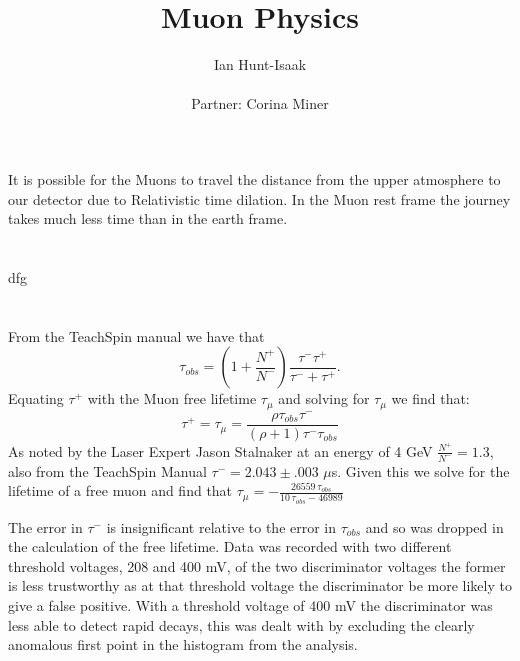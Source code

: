 \documentclass[11pt,letterpaper]{article}
\title{Muon Physics}
\author{Ian Hunt-Isaak\\ \begin{small}
Partner: Corina Miner
\end{small}}
\begin{document}
\date{}
\maketitle
\section{} %
It is possible for the Muons to travel the distance from the upper atmosphere to our detector due to Relativistic time dilation. In the Muon rest frame the journey takes much less time than in the earth frame. 


\section{} %
dfg
\section{} %
From the TeachSpin manual we have that 
\begin{equation}
\label{eq:t_obs}
    \tau_{obs} = \left(1+\frac{N^+}{N^-}\right)\frac{\tau^-\tau^+}{\tau^-+\tau^+}.
\end{equation}
Equating $\tau^+$ with the Muon free lifetime $\tau_{\mu}$ and solving for $\tau_{\mu}$ we find that:
\begin{equation}
 \tau^+=\tau_{\mu} = \frac{\rho\tau_{\mathit{obs}} \tau^-}{{\left(\rho + 1\right)} \tau^ - \tau_{\mathit{obs}}}
\end{equation}
As noted by the Laser Expert Jason Stalnaker at an energy of 4 GeV $\frac{N^+}{N^-}=1.3$, also from the TeachSpin Manual $\tau^-=2.043 \pm.003$ $\mu$s. Given this we solve for the lifetime of a free muon and find that $\tau_{\mu}= -\frac{26559 \, \tau_{\mathit{obs}}}{10 \, \tau_{\mathit{obs}} - 46989}$

The error in $\tau^-$ is insignificant relative to the error in $\tau_{obs}$ and so was dropped in the calculation of the free lifetime. Data was recorded with two different threshold voltages, 208 and 400 mV, of the two discriminator voltages the former is less trustworthy as at that threshold voltage the discriminator be more likely to give a false positive. With a threshold voltage of 400 mV the discriminator was less able to detect rapid decays, this was dealt with by excluding the clearly anomalous first point in the histogram from the analysis.
\end{document}
